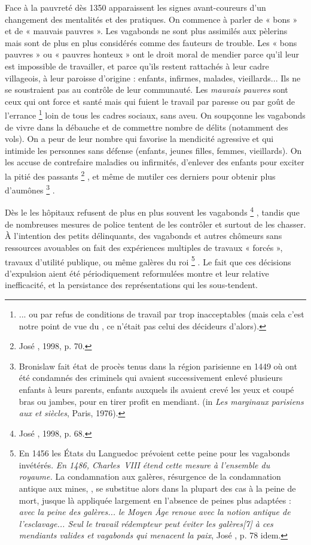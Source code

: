  Face à la pauvreté dès 1350 apparaissent les signes avant-coureurs d'un changement des mentalités et des pratiques. On commence à parler de « {bons} » et de « {mauvais pauvres} ». Les vagabonds ne sont plus assimilés aux pèlerins mais sont de plus en plus considérés comme des fauteurs de trouble. Les « {bons pauvres} » ou « {pauvres honteux} » ont le droit moral de mendier parce qu'il leur est impossible de travailler, et parce qu'ils restent rattachés à leur cadre villageois, à leur paroisse d'origine : enfants, infirmes, malades, vieillards... Ils ne se soustraient pas au contrôle de leur communauté. Les \emph{mauvais pauvres} sont ceux qui ont force et santé mais qui fuient le travail par paresse ou par goût de l'errance%
\footnote{... ou par refus de conditions de travail par trop inacceptables (mais cela c'est notre point de vue du , ce n'était pas celui des décideurs d'alors).} 
loin de tous les cadres sociaux, sans aveu. On soupçonne les vagabonds de vivre dans la débauche et de commettre nombre de délits (notamment des vols). On a peur de leur nombre qui favorise la mendicité agressive et qui intimide les personnes sans défense (enfants, jeunes filles, femmes, vieillards). On les accuse de contrefaire maladies ou infirmités, d'enlever des enfants pour exciter la pitié des passants%
\footnote{José , 1998, p. 70.}%
, et même de mutiler ces derniers pour obtenir plus d'aumônes%
\footnote{Bronislaw  fait état de procès tenus dans la région parisienne en 1449 où ont été condamnés des criminels qui avaient successivement enlevé plusieurs enfants à leurs parents, enfants auxquels ils avaient crevé les yeux et coupé bras ou jambes, pour en tirer profit en mendiant. (in \emph{Les marginaux parisiens aux  et  siècles}, Paris, 1976).}%
. 

 Dès le  les hôpitaux refusent de plus en plus souvent les vagabonds%
\footnote{José , 1998, p. 68.}%
, tandis que de nombreuses mesures de police tentent de les contrôler et surtout de les chasser. À l'intention des petits délinquants, des vagabonds et autres chômeurs sans ressources avouables on fait des expériences multiples de travaux « forcés », travaux d'utilité publique, ou même galères du roi%
\footnote{En 1456 les États du Languedoc prévoient cette peine pour les vagabonds invétérés. \emph{En 1486, Charles~VIII étend cette mesure à l'ensemble du royaume.} La condamnation aux galères, résurgence de la condamnation antique aux mines, , se substitue alors dans la plupart des cas à la peine de mort, jusque là appliquée largement en l'absence de peines plus adaptées : \emph{avec la peine des galères... le Moyen Âge renoue avec la notion antique de l'esclavage... Seul le travail rédempteur peut éviter les galères[7] à ces mendiants valides et vagabonds qui menacent la paix}, José , p. 78 idem.}%
. Le fait que ces décisions d'expulsion aient été périodiquement reformulées montre et leur relative inefficacité, et la persistance des représentations qui les sous-tendent.

